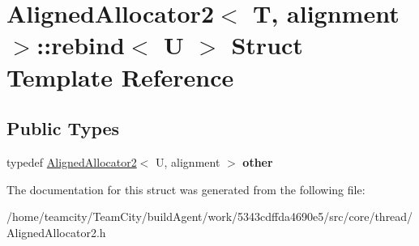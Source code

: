 \hypertarget{structAlignedAllocator2_1_1rebind}{}\section{Aligned\+Allocator2$<$ T, alignment $>$\+:\+:rebind$<$ U $>$ Struct Template Reference}
\label{structAlignedAllocator2_1_1rebind}
\subsection*{Public Types}
\begin{DoxyCompactItemize}
\item 
typedef \hyperlink{classAlignedAllocator2}{Aligned\+Allocator2}$<$ U, alignment $>$ {\bfseries other}\hypertarget{structAlignedAllocator2_1_1rebind_aec03ce0dfb8c91e6681f127bced6fbc8}{}\label{structAlignedAllocator2_1_1rebind_aec03ce0dfb8c91e6681f127bced6fbc8}

\end{DoxyCompactItemize}


The documentation for this struct was generated from the following file\+:\begin{DoxyCompactItemize}
\item 
/home/teamcity/\+Team\+City/build\+Agent/work/5343cdffda4690e5/src/core/thread/Aligned\+Allocator2.\+h\end{DoxyCompactItemize}
